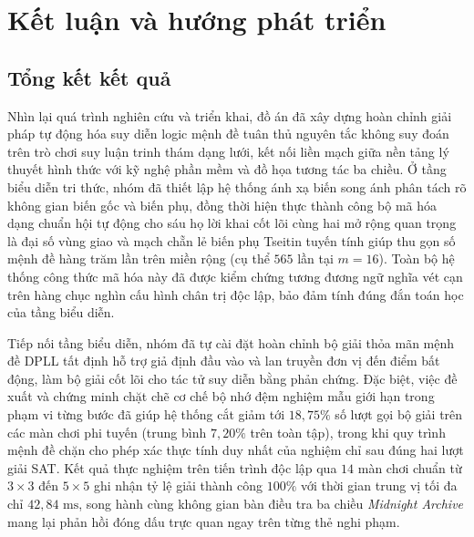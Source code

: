 \section{Kết luận và hướng phát triển}
\label{sec:conclusion}

\subsection{Tổng kết kết quả}
Nhìn lại quá trình nghiên cứu và triển khai, đồ án đã xây dựng hoàn chỉnh giải pháp
tự động hóa suy diễn logic mệnh đề tuân thủ nguyên tắc không suy đoán trên trò chơi
suy luận trinh thám dạng lưới, kết nối liền mạch giữa nền tảng lý thuyết hình thức
với kỹ nghệ phần mềm và đồ họa tương tác ba chiều. Ở tầng biểu diễn tri thức, nhóm
đã thiết lập hệ thống ánh xạ biến song ánh phân tách rõ không gian biến gốc và biến
phụ, đồng thời hiện thực thành công bộ mã hóa dạng chuẩn hội tự động cho sáu họ lời
khai cốt lõi cùng hai mở rộng quan trọng là đại số vùng giao và mạch chẵn lẻ biến
phụ Tseitin tuyến tính giúp thu gọn số mệnh đề hàng trăm lần trên miền rộng (cụ thể
$565$ lần tại $m = 16$). Toàn bộ hệ thống công thức mã hóa này đã được kiểm chứng
tương đương ngữ nghĩa vét cạn trên hàng chục nghìn cấu hình chân trị độc lập, bảo
đảm tính đúng đắn toán học của tầng biểu diễn.

Tiếp nối tầng biểu diễn, nhóm đã tự cài đặt hoàn chỉnh bộ giải thỏa mãn mệnh đề
DPLL tất định hỗ trợ giả định đầu vào và lan truyền đơn vị đến điểm bất động, làm
bộ giải cốt lõi cho tác tử suy diễn bằng phản chứng. Đặc biệt, việc đề xuất và
chứng minh chặt chẽ cơ chế bộ nhớ đệm nghiệm mẫu giới hạn trong phạm vi từng bước
đã giúp hệ thống cắt giảm tới $18{,}75\%$ số lượt gọi bộ giải trên các màn chơi phi tuyến (trung bình $7{,}20\%$ trên toàn tập), trong khi quy trình mệnh
đề chặn cho phép xác thực tính duy nhất của nghiệm chỉ sau đúng hai lượt giải SAT.
Kết quả thực nghiệm trên tiến trình độc lập qua $14$ màn chơi chuẩn từ $3 \times 3$
đến $5 \times 5$ ghi nhận tỷ lệ giải thành công $100\%$ với thời gian trung vị tối
đa chỉ $42{,}84\text{ ms}$, song hành cùng không gian bàn điều tra ba chiều
\textit{Midnight Archive} mang lại phản hồi đóng dấu trực quan ngay trên từng thẻ
nghi phạm.

